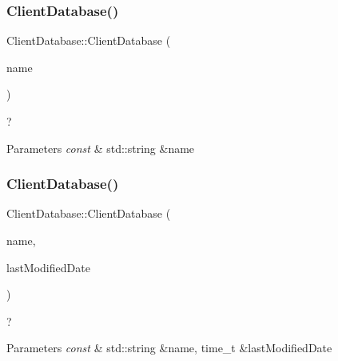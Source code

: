 \subsubsection{\texorpdfstring{Client\+Database()}{ClientDatabase()}\hspace{0.1cm}{\footnotesize\ttfamily [2/3]}}
{\footnotesize\ttfamily Client\+Database\+::\+Client\+Database (\begin{DoxyParamCaption}\item[{const std\+::string \&}]{name }\end{DoxyParamCaption})}



? 


\begin{DoxyParams}{Parameters}
{\em const} & std\+::string \&name \\
\hline
\end{DoxyParams}
\mbox{\label{classdb_1_1_client_database_a59973465f454ada5665d274c7565a4ec}} 
\subsubsection{\texorpdfstring{Client\+Database()}{ClientDatabase()}\hspace{0.1cm}{\footnotesize\ttfamily [3/3]}}
{\footnotesize\ttfamily Client\+Database\+::\+Client\+Database (\begin{DoxyParamCaption}\item[{const std\+::string \&}]{name,  }\item[{time\+\_\+t \&}]{last\+Modified\+Date }\end{DoxyParamCaption})}



? 


\begin{DoxyParams}{Parameters}
{\em const} & std\+::string \&name, time\+\_\+t \&last\+Modified\+Date \\
\hline
\end{DoxyParams}
\mbox{\label{classdb_1_1_client_database_af0249c4d0a723a6a39684895f226e40d}} 
